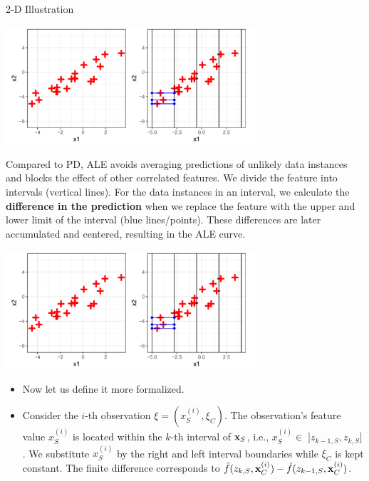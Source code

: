 \begin{vbframe}{2-D Illustration}

\begin{center}
\includegraphics[width=0.7\textwidth]{figure_man/2D01.png}
\end{center}

Compared to PD, ALE avoids averaging predictions of unlikely data instances and blocks the effect of other correlated features. We divide the feature into intervals (vertical lines). For the data instances in an interval, we calculate the \textbf{difference in the prediction} when we replace the feature with the upper and lower limit of the interval (blue lines/points). These differences are later accumulated and centered, resulting in the ALE curve.

\framebreak

\begin{center}
\includegraphics[width=0.7\textwidth]{figure_man/2D01.png}
\end{center}


 \begin{itemize}
  \item Now let us define it more formalized.
  \item  Consider the $i$-th observation $\xi = (x_S^{(i)}, \xi_C)$. The observation's feature value $x_S^{(i)}$ is located within the $k$-th interval of $\xv_S$, i.e., $x_S^{(i)} \in \; ]z_{k-1, S}, z_{k, S}]$. We substitute $x_S^{(i)}$ by the right and left interval boundaries while $\xi_C$ is kept constant. The finite difference corresponds to $\fh(z_{k, S}, \xi_C) - \fh(z_{k-1, S}, \xi_C)$.
\end{itemize}



\end{vbframe}
